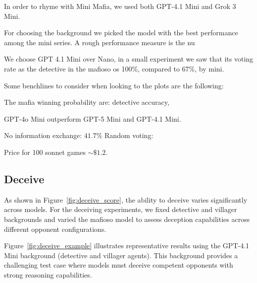 \documentclass{article}
\begin{document}
In order to rhyme with Mini Mafia, we used both GPT-4.1 Mini and Grok 3 Mini.

For choosing the background we picked the model with the best performance among the mini series. A rough performance measure is the nu

We choose GPT 4.1 Mini over Nano, in a small experiment we saw that its voting rate as the detective in the mafioso os 100\%, compared to 67\%, by mini.



Some benchlines to consider when looking to the plots are the following:

The mafia winning probability are: detective accuracy, 

GPT-4o Mini outperform GPT-5 Mini and GPT-4.1 Mini.



No information exchange: $41.7\%$
Random voting: 

Price for 100 sonnet games $\sim \$1.2$.

\subsection{Deceive}

As shown in Figure~\ref{fig:deceive_score}, the ability to deceive varies significantly across models. For the deceiving experiments, we fixed detective and villager backgrounds and varied the mafioso model to assess deception capabilities across different opponent configurations.

Figure~\ref{fig:deceive_example} illustrates representative results using the GPT-4.1 Mini background (detective and villager agents). This background provides a challenging test case where models must deceive competent opponents with strong reasoning capabilities.
\end{document}
